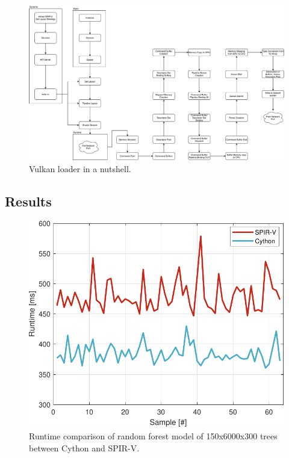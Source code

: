 \documentclass{IEEEtran}
\begin{document}
\begin{figure}
  \centering
  \includegraphics[width=\columnwidth*2]{vulkan3.pdf}
  \caption{Vulkan loader in a nutshell.}
  \label{fig:vulkan}
\end{figure}

\subsection{Results}
\label{ch:results}

\begin{figure}
  \centering
  \includegraphics[width=\columnwidth]{bench.pdf}
  \caption{Runtime comparison of random forest model of 150x6000x300 trees between Cython and SPIR-V.}
  \label{fig:bench}
\end{figure}
\end{document}
